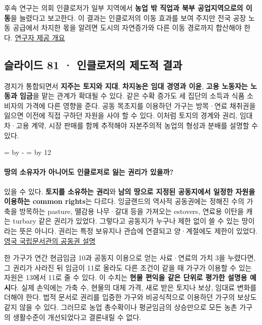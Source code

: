 \documentclass[10pt,a4paper]{article}
\newcommand{\ReserveQuestionSpace}{%
  \par\begingroup
  \dimen0=\pagegoal \advance\dimen0 by -\pagetotal
  \dimen2=\baselineskip \multiply\dimen2 by 12
  \ifdim\dimen0<\dimen2 \newpage\fi
  \endgroup}
\begin{document}
후속 연구는 의회 인클로저가 일부 지역에서 \textbf{농업 밖 직업과 북부 공업지역으로의 이동}을 늘렸다고 보고한다. 이 결과는 인클로저의 이동 효과를 보여 주지만 전국 공장 노동 공급에서 차지한 몫을 알려면 도시의 자연증가와 다른 이동 경로까지 합산해야 한다. \href{https://voices.uchicago.edu/jamesrobinson/2024/07/15/the-economic-effects-of-the-english-parliamentary-enclosures/}{연구자 제공 개요}\par

\subsection{슬라이드 81 · 인클로저의 제도적 결과}
경지가 통합되면서 \textbf{지주는 토지와 지대}, \textbf{차지농은 임대 경영과 이윤}, \textbf{고용 노동자는 노동과 임금}을 맡는 관계가 확대될 수 있다. 같은 수확 증가도 세 집단의 소득과 식품 소비자의 가격에 다른 영향을 준다. 공동 목초지를 이용하던 가구는 방목·연료 채취권을 잃으면 이전에 직접 구하던 자원을 사야 할 수 있다. 이처럼 토지의 경계와 권리, 임대차·고용 계약, 시장 판매를 함께 추적해야 자본주의적 농업의 형성과 분배를 설명할 수 있다.\par

\ReserveQuestionSpace
\paragraph{땅의 소유자가 아니어도 인클로저로 잃는 권리가 있을까?}
있을 수 있다. \textbf{토지를 소유하는 권리}와 \textbf{남의 땅으로 지정된 공동지에서 일정한 자원을 이용하는 common rights}는 다르다. 잉글랜드의 역사적 공동권에는 정해진 수의 가축을 방목하는 pasture, 땔감용 나무·갈대 등을 가져오는 estovers, 연료용 이탄을 캐는 turbary 같은 권리가 있었다. 그렇다고 공동지가 누구나 제한 없이 쓸 수 있는 땅이라는 뜻은 아니다. 권리는 특정 보유지나 관습에 연결되고 양·계절에도 제한이 있었다. \href{https://www.nationalarchives.gov.uk/help-with-your-research/research-guides/common-lands/}{영국 국립문서관의 공동권 설명}\par

한 가구가 연간 현금임금 10과 공동지 이용으로 얻는 사료·연료의 가치 3을 누렸다면, 그 권리가 사라진 뒤 임금이 11로 올라도 다른 조건이 같을 때 가구가 이용할 수 있는 자원은 13에서 11로 줄 수 있다. 이 수치는 \textbf{현물 편익을 같은 단위로 평가한 설명용 예시}다. 실제 손익에는 가축 수, 현물의 대체 가격, 새로 받은 토지나 보상, 임대료 변화를 더해야 한다. 법적 문서로 권리를 입증한 가구와 비공식적으로 이용하던 가구의 보상도 같지 않을 수 있다. 그러므로 농업 총수확이나 평균임금의 상승만으로 모든 농촌 가구의 생활수준이 개선되었다고 결론내릴 수 없다.\par
\end{document}
